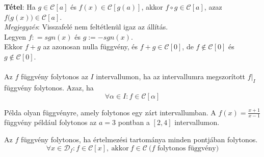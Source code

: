 \documentclass[tikz,12pt,margin=0px]{article}
\newcommand\ddfrac[2]{\frac{\displaystyle #1}{\displaystyle #2}}
\begin{document}
    \noindent \textbf{Tétel}: Ha $g \in \mathcal{C}[a]$ és $f(x) \in \mathcal{C}[g(a)]$, akkor $f \circ g \in \mathcal{C}[a]$, azaz $f\big(g(x)\big) \in \mathcal{C}[a]$.\\

    \noindent \emph{Megjegyzés}: Visszafelé nem feltétlenül igaz az állítás.\\
    Legyen $f : = sgn(x)$ és $g := -sgn(x)$. \\
    Ekkor $f + g$ az azonosan nulla függvény, és $f + g \in \mathcal{C}[0]$, de $f \not \in \mathcal{C}[0]$ és $g \not \in \mathcal{C}[0]$.\\\\

    \noindent Az $f$ függvény folytonos az $I$ intervallumon, ha az intervallumra megszorított $f|_{I}$ függvény folytonos. Azaz, ha
    \[
        \forall \alpha \in I: f \in \mathcal{C}[\alpha]
    \]

    \noindent Példa olyan függvényre, amely folytonos egy zárt intervallumban. A $f(x)=\ddfrac{x+1}{x-1}$ függvény például folytonos az $a=3$ pontban a $[2,4]$ intervallumon.

    \begin{center}
    \end{center}

    \noindent Az $f$ függvény folytonos, ha értelmezési tartománya minden pontjában folytonos.\\
    \[
        \forall x \in \mathcal{D}_{f} : f \in \mathcal{C}[x],\ \text{akkor}\ f \in \mathcal{C}\ \text{($f$ folytonos függvény)}
    \]
\end{document}
